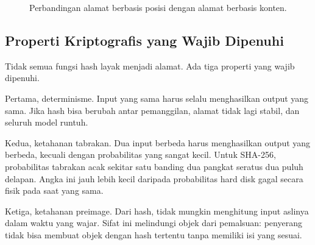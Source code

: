 \documentclass[11pt,a4paper]{article}
\begin{document}
\begin{figure}[H]
	\centering
	\caption{Perbandingan alamat berbasis posisi dengan alamat berbasis konten.}
	\label{fig:address-vs-content}
\end{figure}

\subsection{Properti Kriptografis yang Wajib Dipenuhi}

Tidak semua fungsi hash layak menjadi alamat. Ada tiga properti yang wajib dipenuhi.

Pertama, determinisme. Input yang sama harus selalu menghasilkan output yang sama. Jika hash bisa berubah antar pemanggilan, alamat tidak lagi stabil, dan seluruh model runtuh.

Kedua, ketahanan tabrakan. Dua input berbeda harus menghasilkan output yang berbeda, kecuali dengan probabilitas yang sangat kecil. Untuk SHA-256, probabilitas tabrakan acak sekitar satu banding dua pangkat seratus dua puluh delapan. Angka ini jauh lebih kecil daripada probabilitas hard disk gagal secara fisik pada saat yang sama.

Ketiga, ketahanan preimage. Dari hash, tidak mungkin menghitung input aslinya dalam waktu yang wajar. Sifat ini melindungi objek dari pemalsuan: penyerang tidak bisa membuat objek dengan hash tertentu tanpa memiliki isi yang sesuai.
\end{document}
